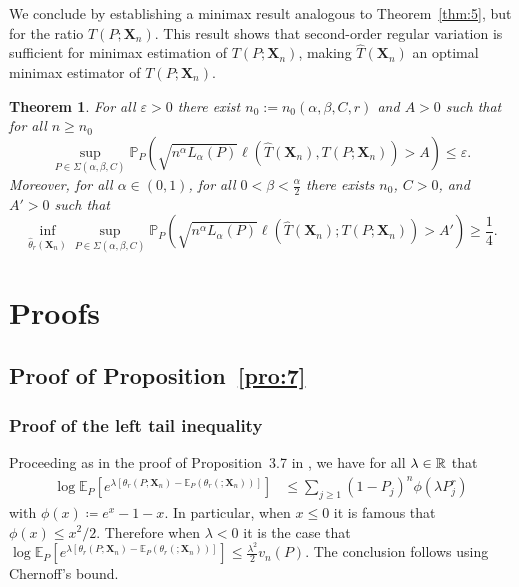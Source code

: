 \documentclass{article}
\newtheorem{theorem}{Theorem}
\newcommand{\1}{\boldsymbol{1}}
\newcommand{\EE}{\mathbb{E}}
\newcommand{\PP}{\mathbb{P}}
\theoremstyle{plain}
\begin{document}
We conclude by establishing a minimax result analogous to Theorem~\ref{thm:5}, but for the ratio $T(P;\mathbf{X}_n)$. This result shows that second-order regular variation is sufficient for minimax estimation of $T(P;\mathbf{X}_n)$, making $\hat{T}(\mathbf{X}_{n})$ an optimal minimax estimator of $T(P;\mathbf{X}_n)$.

\begin{theorem}
  \label{thm:rare-types-minimax}
  For all $\varepsilon > 0$ there exist $n_0:= n_0(\alpha,\beta,C,r)$ and $A >0$ such that for all $n \geq n_0$
  \begin{displaymath}
    \sup_{P\in \Sigma(\alpha,\beta,C)}\PP_P\left( \sqrt{n^{\alpha}L_{\alpha}(P) }\ell(\hat{T}(\mathbf{X}_{n}),T(P;\mathbf{X}_n))  > A\right)%
    \leq \varepsilon.
  \end{displaymath}
    Moreover, for all $\alpha \in (0,1)$, for all $0 < \beta < \frac{\alpha}{2}$ there exists $n_0$, $C > 0$, and $A' > 0$ such that
  \begin{displaymath}
    \inf_{\hat{\theta}_r(\mathbf{X}_{n})}\sup_{P\in \Sigma(\alpha,\beta,C)}\PP_P\left(\sqrt{n^{\alpha}L_{\alpha}(P) }\ell(\hat{T}(\mathbf{X}_n);T(P;\mathbf{X}_n))  > A' \right)%
    \geq \frac{1}{4}.
  \end{displaymath}
\end{theorem}


\appendix

\section{Proofs}
\label{sec:proofs-1}

\subsection{Proof of Proposition~\ref{pro:7}}
\label{sec:proof-pro:tail-bounds}

\subsubsection{Proof of the left tail inequality}

  Proceeding as in the proof of Proposition~3.7 in \cite{Ben(17)}, we have for all $\lambda \in \mathbb{R}$ that
  \begin{align*}
    \log \EE_P[e^{\lambda[\theta_r(P;\mathbf{X}_n) - \EE_P(\theta_r(;\mathbf{X}_n))]}]%
    &\leq \sum_{j\geq 1}(1 - P_j)^n\phi(\lambda P_j^r)
  \end{align*}
  with $\phi(x) \coloneqq e^x - 1 - x$. In particular, when $x \leq 0$ it is famous that $\phi(x) \leq x^2/2$. Therefore when $\lambda < 0$ it is the case that $\log\EE_P[e^{\lambda[\theta_r(P;\mathbf{X}_n) - \EE_P(\theta_r(;\mathbf{X}_n))]}] \leq \frac{\lambda^2}{2}v_n(P)$. The conclusion follows using Chernoff's bound.
\end{document}
